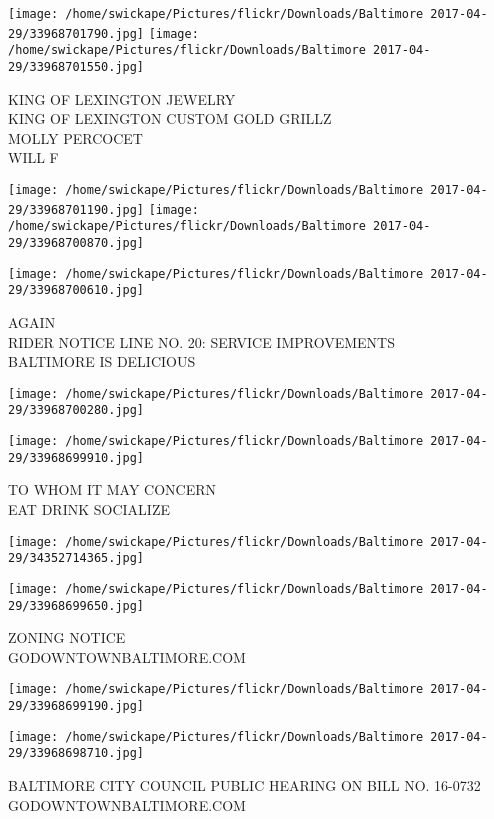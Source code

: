 \documentclass[10pt,letterpaper]{article}
\begin{document}
\texttt{[image: /home/swickape/Pictures/flickr/Downloads/Baltimore 2017-04-29/33968701790.jpg]}
\texttt{[image: /home/swickape/Pictures/flickr/Downloads/Baltimore 2017-04-29/33968701550.jpg]}

KING OF LEXINGTON JEWELRY\\
KING OF LEXINGTON CUSTOM GOLD GRILLZ\\
MOLLY PERCOCET\\
WILL F
\pagebreak

\texttt{[image: /home/swickape/Pictures/flickr/Downloads/Baltimore 2017-04-29/33968701190.jpg]}
\texttt{[image: /home/swickape/Pictures/flickr/Downloads/Baltimore 2017-04-29/33968700870.jpg]}

\vspace{0.25in}
\texttt{[image: /home/swickape/Pictures/flickr/Downloads/Baltimore 2017-04-29/33968700610.jpg]}

AGAIN\\
RIDER NOTICE LINE NO. 20: SERVICE IMPROVEMENTS\\
BALTIMORE IS DELICIOUS
\pagebreak

\texttt{[image: /home/swickape/Pictures/flickr/Downloads/Baltimore 2017-04-29/33968700280.jpg]}

\vspace{0.25in}
\texttt{[image: /home/swickape/Pictures/flickr/Downloads/Baltimore 2017-04-29/33968699910.jpg]}

TO WHOM IT MAY CONCERN\\
EAT DRINK SOCIALIZE
\pagebreak

\texttt{[image: /home/swickape/Pictures/flickr/Downloads/Baltimore 2017-04-29/34352714365.jpg]}

\vspace{0.25in}
\texttt{[image: /home/swickape/Pictures/flickr/Downloads/Baltimore 2017-04-29/33968699650.jpg]}

ZONING NOTICE\\
GODOWNTOWNBALTIMORE.COM
\pagebreak

\texttt{[image: /home/swickape/Pictures/flickr/Downloads/Baltimore 2017-04-29/33968699190.jpg]}

\vspace{0.25in}
\texttt{[image: /home/swickape/Pictures/flickr/Downloads/Baltimore 2017-04-29/33968698710.jpg]}

BALTIMORE CITY COUNCIL PUBLIC HEARING ON BILL NO. 16{-}0732\\
GODOWNTOWNBALTIMORE.COM
\pagebreak
\end{document}

